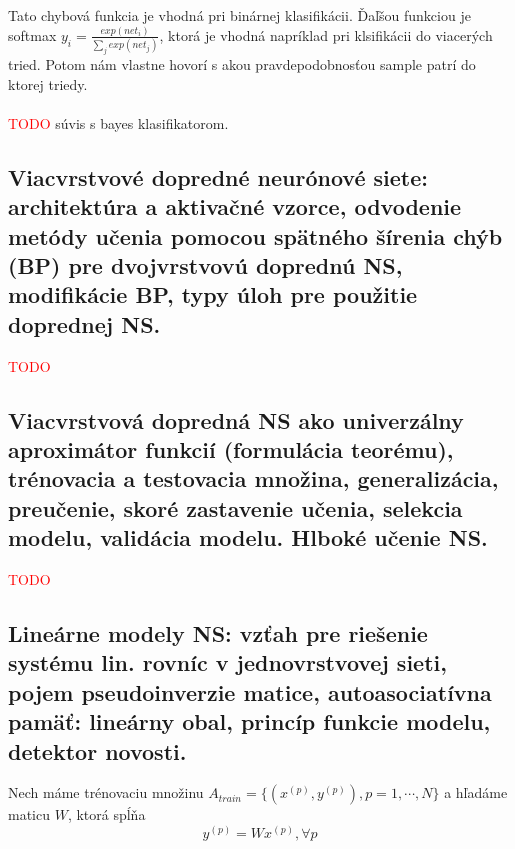 \documentclass{article}
\numberwithin{equation}{section} %
\begin{document}
Tato chybová funkcia je vhodná pri binárnej klasifikácii. Ďaľšou funkciou je softmax $y_i = \frac{exp(net_i)}{\sum_j exp(net_j)}$, ktorá je vhodná napríklad pri klsifikácii do viacerých tried. Potom nám vlastne hovorí s akou pravdepodobnosťou sample patrí do ktorej triedy.
\\\\ \textcolor{red}{TODO} súvis s bayes klasifikatorom.

\subsection{Viacvrstvové dopredné neurónové siete: architektúra a aktivačné vzorce, odvodenie metódy učenia pomocou spätného šírenia chýb (BP) pre dvojvrstvovú doprednú NS, modifikácie BP, typy úloh pre použitie doprednej NS.}
\textcolor{red}{TODO}


\subsection{Viacvrstvová dopredná NS ako univerzálny aproximátor funkcií (formulácia teorému), trénovacia a testovacia množina, generalizácia, preučenie, skoré zastavenie učenia, selekcia modelu, validácia modelu. Hlboké učenie NS.}
\textcolor{red}{TODO}


\subsection{Lineárne modely NS: vzťah pre riešenie systému lin. rovníc v jednovrstvovej sieti, pojem pseudoinverzie matice, autoasociatívna pamäť: lineárny obal, princíp funkcie modelu, detektor novosti.}
Nech máme trénovaciu množinu $A_{train} = \{ (x^{(p)}, y^{(p)}), p=1,\cdots,N \}$ a hľadáme maticu $W$, ktorá spĺňa $$y^{(p)} = Wx^{(p)}, \forall p$$
\end{document}
